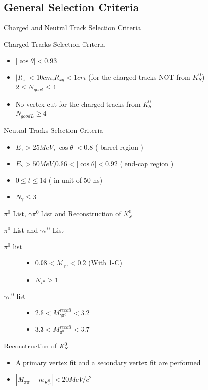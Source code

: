 \documentclass{beamer}
\begin{document}
\subsection{General Selection Criteria}
\begin{frame}{Charged and Neutral Track Selection Criteria}
\begin{block}{Charged Tracks Selection Criteria}
\begin{itemize}
\item $ | \cos\theta |<0.93$
\item $|R_{z}|<10cm$,$R_{xy}<1cm$ (for the charged tracks NOT from $K^0_S$)\\ $2\le N_{good}\le 4$
\item No vertex cut for the charged tracks from $K^0_S$ \\ $N_{goodL}\ge 4$
\end{itemize}
\end{block}
\begin{block}{Neutral Tracks Selection Criteria}
\begin{itemize}
\item $E_{\gamma}>25 MeV$,$|\cos\theta|<0.8$ ( barrel region )
\item $E_{\gamma}>50 MeV$,$0.86<|\cos\theta|<0.92$ ( end-cap region )
\item $0\le t\le 14$ ( in unit of 50 ns)
\item $N_{\gamma}\le3$
\end{itemize}
\end{block}
\end{frame}
\begin{frame}{$\pi^0$ List, $\gamma\pi^0$ List and Reconstruction of $K^0_S$}
\begin{block}{$\pi^0$ List and $\gamma \pi^0$ List}
\begin{description}
\item[$\pi^0$ list]
\begin{itemize}
\item $0.08<M_{\gamma\gamma}<0.2$ (With 1-C)
\item $N_{\pi^0}\ge 1$
\end{itemize}
\bigskip
\item[$\gamma\pi^0$ list]
\begin{itemize}
\item $2.8<M^{recoil}_{\gamma\pi^0}<3.2$
\item $3.3<M^{recoil}_{\pi^0}<3.7$
\end{itemize}
\end{description}
\end{block}
\begin{block}{Reconstruction of $K^0_S$}
\begin{itemize}
\item A primary vertex fit and a secondary vertex fit are performed
\item $ |M_{\pi \pi} - m_{K_S^0} | < 20 MeV/c^2$
\end{itemize}
\end{block}
\end{frame}
\end{document}
